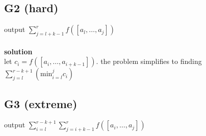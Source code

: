 \documentclass[11pt]{article}
\newcommand{\br}{\\\;\\} %
\newcommand{\soln}{\textbf{solution}\\}
\begin{document}
\subsection{G2 (hard)}
output $\sum_{j=l+k-1}^{r}f([a_{l},\dots,a_{j}])$\br

\soln
let $c_{i} = f([a_{i},\dots,a_{i+k-1}])$. the problem simplifies to finding $\sum_{j=l}^{r-k+1}(\text{min}^{j}_{i=l}c_{i})$

\subsection{G3 (extreme)}
output $\sum_{i=l}^{r-k+1}\sum_{j=i+k-1}^{r}f([a_{i},\dots,a_{j}])$
\end{document}
